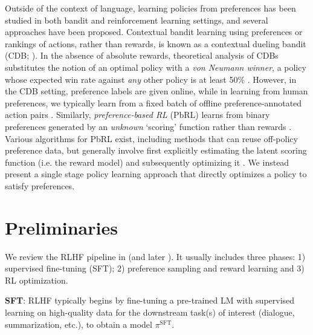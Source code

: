 \documentclass{article}
\newcommand{\pisft}{\pi^\text{SFT}}
\begin{document}
Outside of the context of language, learning policies from preferences has been studied in both bandit and reinforcement learning settings, and several approaches have been proposed. Contextual bandit learning using preferences or rankings of actions, rather than rewards, is known as a contextual dueling bandit (CDB; \cite{yue2012karmed,dudik2015contextual}). In the absence of absolute rewards, theoretical analysis of CDBs substitutes the notion of an optimal policy with a \textit{von Neumann winner}, a policy whose expected win rate against \textit{any} other policy is at least 50\% \citep{dudik2015contextual}. However, in the CDB setting, preference labels are given online, while in learning from human preferences, we typically learn from a fixed batch of offline preference-annotated action pairs \citep{yan2022human}. Similarly, \textit{preference-based RL} (PbRL) learns from binary preferences generated by an \textit{unknown} `scoring' function rather than rewards \citep{BusaFekete2014,ruiz2023dueling}. Various algorithms for PbRL exist, including methods that can reuse off-policy preference data, but generally involve first explicitly estimating the latent scoring function (i.e. the reward model) and subsequently optimizing it \citep{jain2013learning,BusaFekete2014,christiano2017deep,sadigh2017active,kupcsik2018learning}. We instead present a single stage policy learning approach that directly optimizes a policy to satisfy preferences.

\section{Preliminaries}\label{section:prelims}

We review the RLHF pipeline in \citeauthor{ziegler2020finetuning} (and later \citep{stiennon2022learning, bai2022training, ouyang2022training}). It usually includes three phases: 1) supervised fine-tuning (SFT); 2) preference sampling and reward learning and 3) RL optimization.

\textbf{SFT}: RLHF typically begins by fine-tuning a pre-trained LM with supervised learning on high-quality data for the downstream task(s) of interest (dialogue, summarization, etc.), to obtain a model $\pisft$. 
\end{document}
